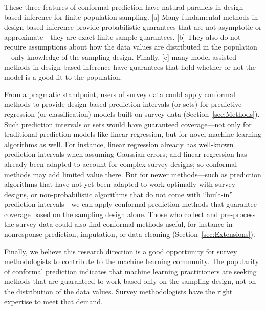 \documentclass[10.5pt, letterpaper]{article}
\numberwithin{table}{section}
\numberwithin{figure}{section}
\numberwithin{equation}{section}
\begin{document}
These three features of conformal prediction have natural parallels in design-based inference for finite-population sampling. [a] Many fundamental methods in design-based inference provide probabilistic guarantees that are not asymptotic or approximate---they are exact finite-sample guarantees. [b] They also do not require assumptions about how the data values are distributed in the population---only knowledge of the sampling design. Finally, [c] many model-assisted methods in design-based inference have guarantees that hold whether or not the model is a good fit to the population.

From a pragmatic standpoint, users of survey data could apply conformal methods to provide design-based prediction intervals (or sets) for predictive regression (or classification) models built on survey data (Section~\ref{sec:Methods}). Such prediction intervals or sets would have guaranteed coverage---not only for traditional prediction models like linear regression, but for novel machine learning algorithms as well.
For instance, linear regression already has well-known prediction intervals when assuming Gaussian errors; and linear regression has already been adapted to account for complex survey designs; so conformal methods may add limited value there. But for newer methods---such as prediction algorithms that have not yet been adapted to work optimally with survey designs, or non-probabilistic algorithms that do not come with ``built-in'' prediction intervals---we can apply conformal prediction methods that guarantee coverage based on the sampling design alone.
Those who collect and pre-process the survey data could also find conformal methods useful, for instance in nonresponse prediction, imputation, or data cleaning (Section~\ref{sec:Extensions}).

Finally, we believe this research direction is a good opportunity for survey methodologists to contribute to the machine learning community. The popularity of conformal prediction indicates that machine learning practitioners are seeking methods that are guaranteed to work based only on the sampling design, not on the distribution of the data values. Survey methodologists have the right expertise to meet that demand.
\end{document}
